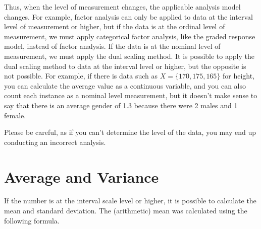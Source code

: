 \documentclass{ltjsbook}
\begin{document}
Thus, when the level of measurement changes, the applicable analysis model changes. For example, factor analysis can only be applied to data at the interval level of measurement or higher, but if the data is at the ordinal level of measurement, we must apply categorical factor analysis, like the graded response model, instead of factor analysis. If the data is at the nominal level of measurement, we must apply the dual scaling method. It is possible to apply the dual scaling method to data at the interval level or higher, but the opposite is not possible. For example, if there is data such as $X=\{170, 175, 165\}$ for height, you can calculate the average value as a continuous variable, and you can also count each instance as a nominal level measurement, but it doesn't make sense to say that there is an average gender of 1.3 because there were 2 males and 1 female.

Please be careful, as if you can't determine the level of the data, you may end up conducting an incorrect analysis.

\section{Average and Variance}
\label{moment}
If the number is at the interval scale level or higher, it is possible to calculate the mean and standard deviation. The (arithmetic) mean was calculated using the following formula.
\end{document}
